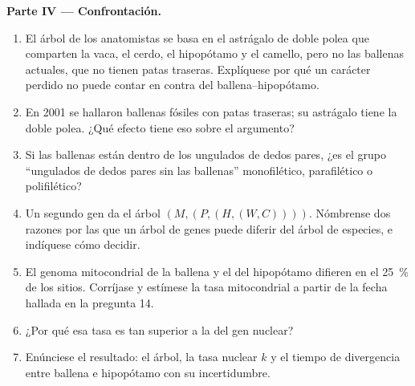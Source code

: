 \begin{problem}
\medskip
\noindent\textbf{Parte IV --- Confrontación.}
\begin{enumerate}[resume]
  \item El árbol de los anatomistas se basa en el astrágalo de doble polea
        que comparten la vaca, el cerdo, el hipopótamo y el camello, pero
        no las ballenas actuales, que no tienen patas traseras. Explíquese
        por qué un carácter perdido no puede contar en contra del 
        ballena--hipopótamo.
  \item En 2001 se hallaron ballenas fósiles con patas traseras; su
        astrágalo tiene la doble polea. ¿Qué efecto tiene eso sobre el
        argumento?
  \item Si las ballenas están dentro de los ungulados de dedos pares, ¿es
        el grupo ``ungulados de dedos pares sin las ballenas'' monofilético,
        parafilético o polifilético?
  \item Un segundo gen da el árbol $(M,(P,(H,(W,C))))$. Nómbrense dos
        razones por las que un árbol de genes puede diferir del árbol de
        especies, e indíquese cómo decidir.
  \item El genoma mitocondrial de la ballena y el del hipopótamo difieren
        en el \qty{25}{\%} de los sitios. Corríjase y estímese la tasa
        mitocondrial a partir de la fecha hallada en la pregunta 14.
  \item ¿Por qué esa tasa es tan superior a la del gen nuclear?
  \item Enúnciese el resultado: el árbol, la tasa nuclear $k$ y el tiempo
        de divergencia entre ballena e hipopótamo con su incertidumbre.
\end{enumerate}
\end{problem}
